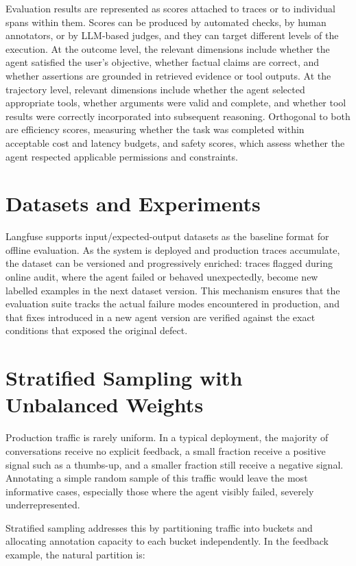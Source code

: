 Evaluation results are represented as scores attached to traces or to individual spans within 
them. Scores can be produced by automated checks, by human annotators, or by LLM-based 
judges, and they can target different levels of the execution. At the outcome level, the 
relevant dimensions include whether the agent satisfied the user's objective, whether factual 
claims are correct, and whether assertions are grounded in retrieved evidence or tool outputs. 
At the trajectory level, relevant dimensions include whether the agent selected appropriate 
tools, whether arguments were valid and complete, and whether tool results were correctly 
incorporated into subsequent reasoning. Orthogonal to both are efficiency scores, measuring whether 
the task was completed within acceptable cost and latency budgets, and safety scores, which 
assess whether the agent respected applicable permissions and constraints.

\section{Datasets and Experiments}

Langfuse supports input/expected-output datasets as the baseline format for offline 
evaluation. As the system is deployed and production traces accumulate, the dataset can be 
versioned and progressively enriched: traces flagged during online audit, where the agent 
failed or behaved unexpectedly, become new labelled examples in the next dataset version. 
This mechanism ensures that the evaluation suite tracks the actual failure modes encountered 
in production, and that fixes introduced in a new agent version are verified against the 
exact conditions that exposed the original defect.

\section{Stratified Sampling with Unbalanced Weights}

Production traffic is rarely uniform. In a typical deployment, the majority of conversations 
receive no explicit feedback, a small fraction receive a positive signal such as a thumbs-up, 
and a smaller fraction still receive a negative signal. Annotating a simple random sample of 
this traffic would leave the most informative cases, especially those where the agent visibly 
failed, severely underrepresented.

Stratified sampling addresses this by partitioning traffic into buckets and allocating 
annotation capacity to each bucket independently. In the feedback example, the natural 
partition is:

